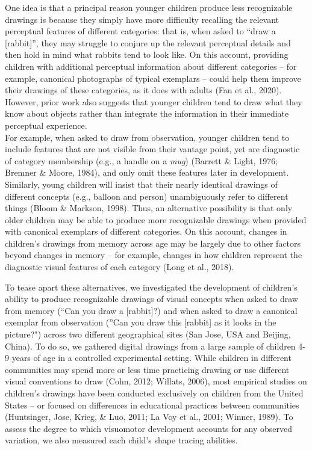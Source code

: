 \documentclass[
  english,
  man]{apa6}
\begin{document}
One idea is that a principal reason younger children produce less recognizable drawings is because they simply have more difficulty recalling the relevant perceptual features of different categories: that is, when asked to \enquote{draw a {[}rabbit{]}}, they may struggle to conjure up the relevant perceptual details and then hold in mind what rabbits tend to look like.
On this account, providing children with additional perceptual information about different categories -- for example, canonical photographs of typical exemplars -- could help them improve their drawings of these categories, as it does with adults (Fan et al., 2020).
However, prior work also suggests that younger children tend to draw what they know about objects rather than integrate the information in their immediate perceptual experience.\\
For example, when asked to draw from observation, younger children tend to include features that are not visible from their vantage point, yet are diagnostic of category membership (e.g., a handle on a \textit{mug}) (Barrett \& Light, 1976; Bremner \& Moore, 1984), and only omit these features later in development.
Similarly, young children will insist that their nearly identical drawings of different concepts (e.g., balloon and person) unambiguously refer to different things (Bloom \& Markson, 1998).
Thus, an alternative possibility is that only older children may be able to produce more recognizable drawings when provided with canonical exemplars of different categories.
On this account, changes in children's drawings from memory across age may be largely due to other factors beyond changes in memory -- for example, changes in how children represent the diagnostic visual features of each category (Long et al., 2018).

To tease apart these alternatives, we investigated the development of children's ability to produce recognizable drawings of visual concepts when asked to draw from memory (\enquote{Can you draw a {[}rabbit{]}?) and when asked to draw a canonical exemplar from observation (}Can you draw this {[}rabbit{]} as it looks in the picture?") across two different geographical sites (San Jose, USA and Beijing, China).
To do so, we gathered digital drawings from a large sample of children 4-9 years of age in a controlled experimental setting.
While children in different communities may spend more or less time practicing drawing or use different visual conventions to draw (Cohn, 2012; Willats, 2006), most empirical studies on children's drawings have been conducted exclusively on children from the United States -- or focused on differences in educational practices between communities (Huntsinger, Jose, Krieg, \& Luo, 2011; La Voy et al., 2001; Winner, 1989).
To assess the degree to which visuomotor development accounts for any observed variation, we also measured each child's shape tracing abilities.
\end{document}
